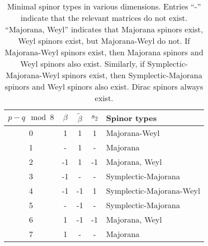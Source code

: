 \documentclass[11pt]{article}
\newcommand{\betat}{\tilde{\beta}}
\begin{document}
\begin{table}
  \centering
  \begin{tabular}{ccccl}
  \toprule
    $p-q \mod 8$ & $\beta$ & $\betat$ & $s_2$ & Spinor types  \\
  \midrule
    0 & 1  & 1  & 1  & Majorana-Weyl            \\
    1 & -  & 1  & -  & Majorana                 \\
    2 & -1 & 1  & -1 & Majorana, Weyl           \\
    3 & -1 & -  & -  & Symplectic-Majorana      \\
    4 & -1 & -1 & 1  & Symplectic-Majorana-Weyl \\
    5 & -  & -1 & -  & Symplectic-Majorana      \\
    6 & 1  & -1 & -1 & Majorana, Weyl           \\
    7 & 1  & -  & -  & Majorana                 \\
  \bottomrule
  \end{tabular}
  \caption{Minimal spinor types in various dimensions.
  Entries ``-'' indicate that the relevant matrices do not exist.
  ``Majorana, Weyl'' indicates that Majorana spinors exist, Weyl spinors exist, but Majorana-Weyl do not.
  If Majorana-Weyl spinors exist, then Majorana spinors and Weyl spinors also exist.
  Similarly, if Symplectic-Majorana-Weyl spinors exist, then Symplectic-Majorana spinors and Weyl spinors also exist.
  Dirac spinors always exist.
  }\label{tab:types}
\end{table}





\end{document}
